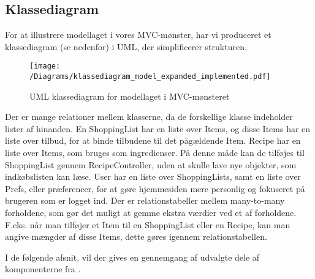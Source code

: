 \subsection{Klassediagram}
For at illustrere modellaget i vores MVC-mønster, har vi produceret et klassediagram (se  nedenfor) i UML, der simplificerer strukturen.

\begin{figure}[H]
\centering
\texttt{[image: /Diagrams/klassediagram\_model\_expanded\_implemented.pdf]}
\caption{UML klassediagram for modellaget i MVC-mønsteret}\label{diagram:klassediagram}
\end{figure}

Der er mange relationer mellem klasserne, da de forskellige klasse indeholder lister af hinanden.
En ShoppingList har en liste over Items, og disse Items har en liste over tilbud, for at binde tilbudene til det pågældende Item.
Recipe har en liste over Items, som bruges som ingredienser. 
På denne måde kan de tilføjes til ShoppingList gennem RecipeController, uden at skulle lave nye objekter, som indkøbslisten kan læse.
User har en liste over ShoppingLists, samt en liste over Prefs, eller præferencer, for at gøre hjemmesiden mere personlig og fokuseret på brugeren som er logget ind.
Der er relationstabeller mellem many-to-many forholdene, som gør det muligt at gemme ekstra værdier ved et af forholdene. 
F.eks. når man tilføjer et Item til en ShoppingList eller en Recipe, kan man angive mængder af disse Items, dette gøres igennem relationstabellen.

I de følgende afsnit, vil der gives en gennemgang af udvalgte dele af komponenterne fra .

